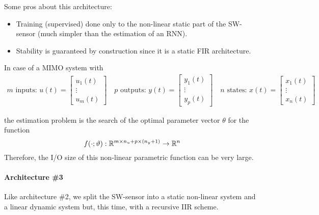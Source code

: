 \begin{remark}[Pros]
	Some pros about this architecture:
	\begin{itemize}
		\item Training (supervised) done only to the non-linear static part of the SW-sensor (much simpler than the estimation of an RNN).
		\item Stability is guaranteed by construction since it is a static FIR architecture.
	\end{itemize}	
\end{remark}

\begin{remark}[Cons]
    In case of a MIMO system with
    \begin{align*}
        m \text{ inputs: } u(t) = \begin{bmatrix}
            u_1(t) \\
            \vdots \\
            u_m(t)
        \end{bmatrix} \quad p \text{ outputs: } y(t) = \begin{bmatrix}
            y_1(t) \\
            \vdots \\
            y_p(t)
        \end{bmatrix} \quad n \text{ states: } x(t) = \begin{bmatrix}
            x_1(t) \\
            \vdots \\
            x_n(t)
        \end{bmatrix}
    \end{align*}

    the estimation problem is the search of the optimal parameter vector $\theta$ for the function
    \[
        f(\cdot; \vartheta): \mathbb{R}^{m\times n_u + p \times (n_y + 1)} \rightarrow \mathbb{R}^n
    \]    
    Therefore, the I/O size of this non-linear parametric function can be very large.
\end{remark}

\paragraph{Architecture \#3} Like architecture \#2, we split the SW-sensor into a static non-linear system and a linear dynamic system but, this time, with a recursive IIR scheme.


